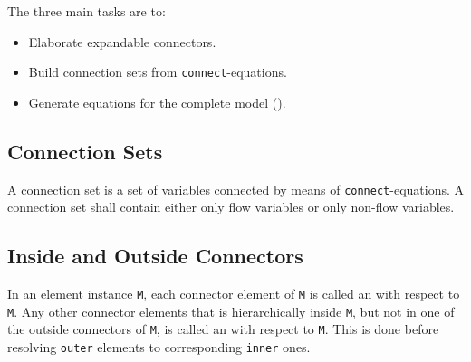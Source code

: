 The three main tasks are to:
\begin{itemize}
\item
  Elaborate expandable connectors.
\item
  Build connection sets from \lstinline!connect!-equations.
\item
  Generate equations for the complete model ().
\end{itemize}

\subsection{Connection Sets}\label{connection-sets}

A connection set is a set of variables connected by means of \lstinline!connect!-equations.
A connection set shall contain either only flow variables or only non-flow variables.

\subsection{Inside and Outside Connectors}\label{inside-and-outside-connectors}

In an element instance \lstinline!M!, each connector element of \lstinline!M! is called an  with respect to \lstinline!M!.
Any other connector elements that is hierarchically inside \lstinline!M!, but not in one of the outside connectors of \lstinline!M!, is called an  with respect to \lstinline!M!.
This is done before resolving \lstinline!outer! elements to corresponding \lstinline!inner! ones.

